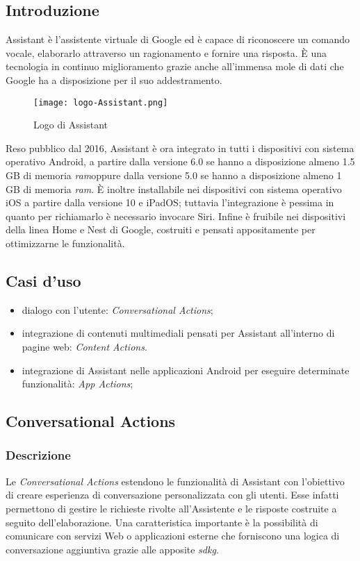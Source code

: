 	\subsection{Introduzione}
	Assistant è l'assistente virtuale di Google ed è capace di riconoscere un comando vocale, elaborarlo attraverso un ragionamento e fornire una risposta. È una tecnologia in continuo miglioramento grazie anche all'immensa mole di dati che Google ha a disposizione per il suo addestramento.
	
	\begin{figure}[htbp]
		\begin{center}
			\texttt{[image: logo-Assistant.png]}
			\caption{Logo di Assistant}
		\end{center}
	\end{figure}
	
	Reso pubblico dal 2016, Assistant è ora integrato in tutti i dispositivi con sistema operativo Android, a partire dalla versione 6.0 se hanno a disposizione almeno 1.5 GB di memoria \emph{\gls{ram}}\glsfirstoccur oppure dalla versione 5.0 se hanno a disposizione almeno 1 GB di memoria \emph{\gls{ram}}. È inoltre installabile nei dispositivi con sistema operativo iOS a partire dalla versione 10 e iPadOS; tuttavia l'integrazione è pessima in quanto per richiamarlo è necessario invocare Siri. Infine è fruibile nei dispositivi della linea Home e Nest di Google, costruiti e pensati appositamente per ottimizzarne le funzionalità.
	\subsection{Casi d'uso}
	\begin{itemize}
		\item dialogo con l'utente: \emph{Conversational Actions};
		\item integrazione di contenuti multimediali pensati per Assistant all'interno di pagine web: \emph{Content Actions}.
		\item integrazione di Assistant nelle applicazioni Android per eseguire determinate funzionalità: \emph{App Actions};
	\end{itemize}
	\subsection{Conversational Actions}
		\subsubsection{Descrizione}
		Le \emph{Conversational Actions} estendono le funzionalità di Assistant con l'obiettivo di creare esperienza di conversazione personalizzata con gli utenti. Esse infatti permettono di gestire le richieste rivolte all'Assistente e le risposte costruite a seguito dell'elaborazione. Una caratteristica importante è la possibilità di comunicare con servizi Web o applicazioni esterne che forniscono una logica di conversazione aggiuntiva grazie alle apposite \emph{\gls{sdkg}}\glsfirstoccur.
